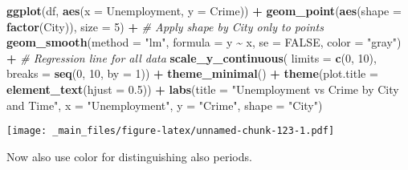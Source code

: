 \documentclass[
]{book}
\newenvironment{Shaded}{\begin{snugshade}}{\end{snugshade}}
\newcommand{\AttributeTok}[1]{\textcolor[rgb]{0.13,0.29,0.53}{#1}}
\newcommand{\CommentTok}[1]{\textcolor[rgb]{0.56,0.35,0.01}{\textit{#1}}}
\newcommand{\ConstantTok}[1]{\textcolor[rgb]{0.56,0.35,0.01}{#1}}
\newcommand{\DecValTok}[1]{\textcolor[rgb]{0.00,0.00,0.81}{#1}}
\newcommand{\FloatTok}[1]{\textcolor[rgb]{0.00,0.00,0.81}{#1}}
\newcommand{\FunctionTok}[1]{\textcolor[rgb]{0.13,0.29,0.53}{\textbf{#1}}}
\newcommand{\NormalTok}[1]{#1}
\newcommand{\SpecialCharTok}[1]{\textcolor[rgb]{0.81,0.36,0.00}{\textbf{#1}}}
\newcommand{\StringTok}[1]{\textcolor[rgb]{0.31,0.60,0.02}{#1}}
\begin{document}
\begin{Shaded}
\begin{Highlighting}[]
\FunctionTok{ggplot}\NormalTok{(df, }\FunctionTok{aes}\NormalTok{(}\AttributeTok{x =}\NormalTok{ Unemployment, }\AttributeTok{y =}\NormalTok{ Crime)) }\SpecialCharTok{+}
  \FunctionTok{geom\_point}\NormalTok{(}\FunctionTok{aes}\NormalTok{(}\AttributeTok{shape =} \FunctionTok{factor}\NormalTok{(City)), }\AttributeTok{size =} \DecValTok{5}\NormalTok{) }\SpecialCharTok{+}  \CommentTok{\# Apply shape by City only to points}
  \FunctionTok{geom\_smooth}\NormalTok{(}\AttributeTok{method =} \StringTok{"lm"}\NormalTok{, }\AttributeTok{formula =}\NormalTok{ y }\SpecialCharTok{\textasciitilde{}}\NormalTok{ x, }\AttributeTok{se =} \ConstantTok{FALSE}\NormalTok{, }\AttributeTok{color =} \StringTok{"gray"}\NormalTok{) }\SpecialCharTok{+}  \CommentTok{\# Regression line for all data}
  \FunctionTok{scale\_y\_continuous}\NormalTok{(}
    \AttributeTok{limits =} \FunctionTok{c}\NormalTok{(}\DecValTok{0}\NormalTok{, }\DecValTok{10}\NormalTok{),}
    \AttributeTok{breaks =} \FunctionTok{seq}\NormalTok{(}\DecValTok{0}\NormalTok{, }\DecValTok{10}\NormalTok{, }\AttributeTok{by =} \DecValTok{1}\NormalTok{)) }\SpecialCharTok{+}
  \FunctionTok{theme\_minimal}\NormalTok{() }\SpecialCharTok{+}
  \FunctionTok{theme}\NormalTok{(}\AttributeTok{plot.title =} \FunctionTok{element\_text}\NormalTok{(}\AttributeTok{hjust =} \FloatTok{0.5}\NormalTok{)) }\SpecialCharTok{+}
  \FunctionTok{labs}\NormalTok{(}\AttributeTok{title =} \StringTok{"Unemployment vs Crime by City and Time"}\NormalTok{,}
       \AttributeTok{x =} \StringTok{"Unemployment"}\NormalTok{,}
       \AttributeTok{y =} \StringTok{"Crime"}\NormalTok{,}
       \AttributeTok{shape =} \StringTok{"City"}\NormalTok{)}
\end{Highlighting}
\end{Shaded}

\texttt{[image: \_main\_files/figure-latex/unnamed-chunk-123-1.pdf]}

Now also use color for distinguishing also periods.
\end{document}
